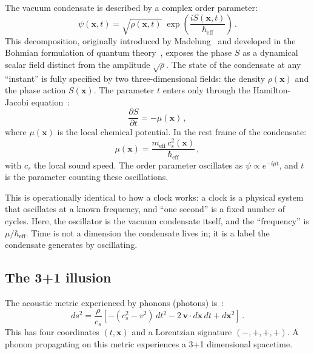 \documentclass[12pt, a4paper]{article}
\newcommand{\meff}{m_{\mathrm{eff}}}
\newcommand{\heff}{\hbar_{\mathrm{eff}}}
\begin{document}
The vacuum condensate is described by a complex
order parameter:
\begin{equation}
    \psi(\mathbf{x}, t) = \sqrt{\rho(\mathbf{x}, t)}\;
    \exp\!\left(\frac{iS(\mathbf{x}, t)}{\heff}\right)\,.
\label{eq:madelung}
\end{equation}
This decomposition, originally introduced by Madelung~\cite{madelung_1927} and developed in the Bohmian formulation of quantum theory~\cite{bohm_1952,holland_1993}, exposes the phase $S$ as a dynamical scalar field distinct from the amplitude $\sqrt{\rho}$.
The state of the condensate at any ``instant'' is
fully specified by two three-dimensional fields:
the density $\rho(\mathbf{x})$ and the phase action
$S(\mathbf{x})$. The parameter $t$ enters only
through the Hamilton-Jacobi equation~\cite{kulangiev_2026a}:
\begin{equation}
    \frac{\partial S}{\partial t} = -\mu(\mathbf{x})\,,
\label{eq:ds_dt}
\end{equation}
where $\mu(\mathbf{x})$ is the local chemical
potential. In the rest frame of the condensate:
\begin{equation}
    \mu(\mathbf{x}) =
    \frac{\meff\,c_s^2(\mathbf{x})}{\heff}\,,
\label{eq:mu}
\end{equation}
with $c_s$ the local sound speed. The order
parameter oscillates as $\psi \propto e^{-i\mu t}$,
and $t$ is the parameter counting these oscillations.

This is operationally identical to how a clock works:
a clock is a physical system that oscillates at a
known frequency, and ``one second'' is a fixed number
of cycles. Here, the oscillator is the vacuum
condensate itself, and the ``frequency'' is $\mu/\heff$.
Time is not a dimension the condensate lives in;
it is a label the condensate generates by oscillating.

\subsection{The 3+1 illusion}

The acoustic metric experienced by phonons
(photons) is~\cite{kulangiev_2026a,visser_1998,barcelo_2005}:
\begin{equation}
    ds^2 = \frac{\rho}{c_s}\left[
    -(c_s^2 - v^2)\,dt^2
    - 2\,\mathbf{v}\cdot d\mathbf{x}\,dt
    + d\mathbf{x}^2\right]\,.
\label{eq:acoustic_metric}
\end{equation}
This has four coordinates $(t, \mathbf{x})$ and a
Lorentzian signature $(-,+,+,+)$. A phonon
propagating on this metric experiences a 3+1
dimensional spacetime.
\end{document}

